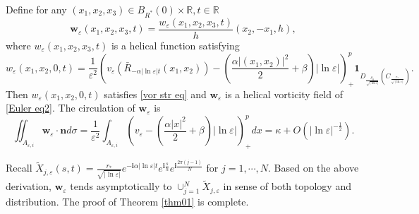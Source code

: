 \documentclass[12pt,reqno]{amsart}
\numberwithin{equation}{section}
\theoremstyle{definition}
\theoremstyle{remark}
\begin{document}
Define for any $ (x_1,x_2,x_3)\in B_{R^*}(0)\times\mathbb{R}, t\in\mathbb{R}  $
\begin{equation*}
\mathbf{w}_\varepsilon(x_1,x_2,x_3,t)= \frac{w_\varepsilon(x_1,x_2,x_3,t)}{h}(x_2,-x_1,h),
\end{equation*}
where $ w_\varepsilon(x_1,x_2,x_3,t) $ is a helical function satisfying
\begin{equation*} 
w_\varepsilon(x_1,x_2,0,t)=\frac{1}{\varepsilon^2}\left( v_\varepsilon(\bar{R}_{-\alpha|\ln\varepsilon| t}(x_1,x_2))-\left( \frac{\alpha|(x_1,x_2)|^2}{2}+\beta\right)|\ln \varepsilon|\right)^p_+\textbf{1}_{D_{\frac{\rho_0}{\sqrt{|\ln\varepsilon|}}}\left (C_{\frac{r_*}{\sqrt{|\ln\varepsilon|}}}\right )}.
\end{equation*}
Then $ w_\varepsilon(x_1,x_2,0,t) $ satisfies \eqref{vor str eq} and $ \mathbf{w}_\varepsilon $ is a  helical vorticity field of \eqref{Euler eq2}.  %
The circulation of $ \mathbf{w}_\varepsilon $ is
\begin{equation*}
\iint_{A_{\varepsilon,i}}\mathbf{w}_\varepsilon\cdot\mathbf{n}d\sigma=\frac{1}{\varepsilon^2} \int_{A_{\varepsilon,i}}\left( v_\varepsilon-\left( \frac{\alpha|x|^2}{2}+\beta\right)|\ln \varepsilon|\right)^p_+dx=\kappa+O\left(|\ln\varepsilon|^{-\frac{1}{2}} \right).
\end{equation*}

Recall $ \tilde{X}_{j,\varepsilon}(s, t)=\frac{r_*}{\sqrt{|\ln\varepsilon|}}e^{-\mathbf{i}\alpha|\ln\varepsilon|t}e^{\mathbf{i}\frac{s}{h}}e^{\mathbf{i}\frac{2\pi (j-1)}{N}} $ for $ j=1,\cdots,N $. Based on the above derivation,   $ \mathbf{w}_\varepsilon $ tends asymptotically to $ \cup_{j=1}^N\tilde{X}_{j,\varepsilon} $ in sense of both topology and distribution. %
The proof of Theorem \ref{thm01} is complete.
\end{document}
